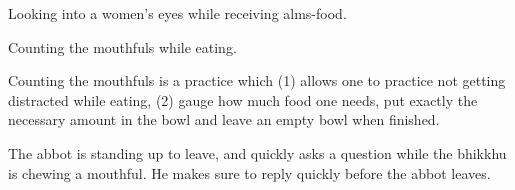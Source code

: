 \begin{exam}{\autoExamName}
\begin{problem*}
\begin{parts}
    \bigskip

    \item {} Looking into a women's eyes while receiving alms-food.

    \bigskip

    \item {} Counting the mouthfuls while eating.

    \begin{solution}
      Counting the mouthfuls is a practice which
      (1) allows one to practice not getting distracted while eating,
      (2) gauge how much food one needs, put exactly the necessary amount in the bowl
      and leave an empty bowl when finished.
    \end{solution}

    \bigskip

    \item {} The abbot is standing up to leave, and quickly asks a question
      while the bhikkhu is chewing a mouthful. He makes sure to reply quickly
      before the abbot leaves.

    \end{parts}

  \end{problem*}

\end{exam}

